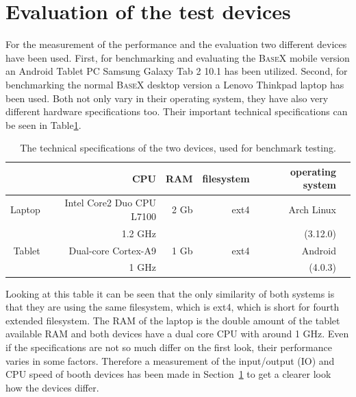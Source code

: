 \section{Evaluation of the test devices}
\label{sec:evaluation-of-the-test-devices}
For the measurement of the performance and the evaluation two different devices have been used.
First, for benchmarking and evaluating the \textsc{BaseX} mobile version an Android Tablet PC Samsung Galaxy Tab 2 10.1 has been utilized.
Second, for benchmarking the normal \textsc{BaseX} desktop version a Lenovo Thinkpad laptop has been used.
Both not only vary in their operating system, they have also very different hardware specifications too.
Their important technical specifications can be seen in Table\ref{tab:test-dev-specs}.
\begin {table}[htpb] 
  \centering
\begin {tabular} {|r|r|r|r|r|r|}
  	\hline
	&CPU&RAM&filesystem&operating system\\
	\hline
	Laptop&Intel Core2 Duo CPU L7100&2 Gb&ext4&Arch Linux\\
	&1.2 GHz&&&(3.12.0)\\
	\hline
	Tablet&Dual-core Cortex-A9&1 Gb&ext4&Android\\
	&1 GHz&&&(4.0.3)\\
	\hline
\end {tabular}
\caption {The technical specifications of the two devices, used for benchmark testing.}
\label {tab:test-dev-specs}
\end {table}
\newpage
Looking at this table it can be seen that the only similarity of both systems is that they are using the same filesystem, which is ext4, which is short for fourth extended filesystem.
The RAM of the laptop is the double amount of the tablet available RAM and both devices have a dual core CPU with around 1 GHz.
Even if the specifications are not so much differ on the first look, their performance varies in some factors.
Therefore a measurement of the input/output (IO) and CPU speed of booth devices has been made in Section~\ref{sec:evaluation-of-the-test-devices} to get a clearer look how the devices differ.



